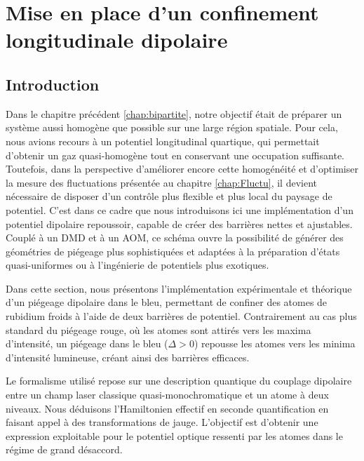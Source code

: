 \chapter{Mise en place d'un confinement longitudinale dipolaire}\label{chap:dipolaire}
\minitoc


\section*{Introduction}

Dans le chapitre précédent \ref{chap:bipartite}, notre objectif était de préparer un système aussi homogène que possible sur une large région spatiale. Pour cela, nous avions recours à un potentiel longitudinal quartique, qui permettait d’obtenir un gaz quasi-homogène tout en conservant une occupation suffisante. Toutefois, dans la perspective d’améliorer encore cette homogénéité et d’optimiser la mesure des fluctuations présentée au chapitre \ref{chap:Fluctu}, il devient nécessaire de disposer d’un contrôle plus flexible et plus local du paysage de potentiel. C’est dans ce cadre que nous introduisons ici une implémentation d’un potentiel dipolaire repoussoir, capable de créer des barrières nettes et ajustables. Couplé à un \gls{DMD} et à un \gls{AOM}, ce schéma ouvre la possibilité de générer des géométries de piégeage plus sophistiquées et adaptées à la préparation d’états quasi-uniformes ou à l’ingénierie de potentiels plus exotiques.

\smallskip

Dans cette section, nous présentons l’implémentation expérimentale et théorique d’un piégeage dipolaire dans le bleu, permettant de confiner des atomes de rubidium froids à l’aide de deux barrières de potentiel. Contrairement au cas plus standard du piégeage rouge, où les atomes sont attirés vers les maxima d’intensité, un piégeage dans le bleu ($\Delta > 0$) repousse les atomes vers les minima d’intensité lumineuse, créant ainsi des barrières efficaces.

\smallskip


Le formalisme utilisé repose sur une description quantique du couplage dipolaire entre un champ laser classique quasi-monochromatique et un atome à deux niveaux. Nous déduisons l’Hamiltonien effectif en seconde quantification en faisant appel à des transformations de jauge. L’objectif est d’obtenir une expression exploitable pour le potentiel optique ressenti par les atomes dans le régime de grand désaccord.


